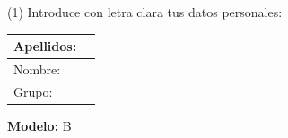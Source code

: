 \documentclass[a4paper,11pt]{article}
\begin{document}


\begin{center}
(1) Introduce con letra clara tus datos personales:
\end{center}

\begin{center}
\large

\begin{tabular}{|l|p{12cm}|}
\hline
Apellidos:   &  \\
\hline
Nombre: &    \\
\hline
Grupo:   &  \\
\hline
\end{tabular}
\end{center}



\vspace{-0.4cm}

\begin{center}
\large
\textbf{Modelo:} B
\end{center}



\vspace{-0.4cm}
\end{document}
